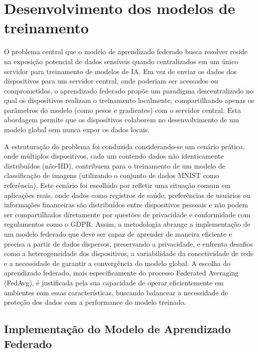 \chapter[Desenvolvimento dos modelos de treinamento]{Desenvolvimento dos modelos de treinamento}
\label{chap:desenvolvimento}

O problema central que o modelo de aprendizado federado busca resolver reside na exposição potencial de dados sensíveis quando centralizados em um único servidor para treinamento de modelos de IA. Em vez de enviar os dados dos dispositivos para um servidor central, onde poderiam ser acessados ou comprometidos, o aprendizado federado propõe um paradigma descentralizado no qual os dispositivos realizam o treinamento localmente, compartilhando apenas os parâmetros do modelo (como pesos e gradientes) com o servidor central. Esta abordagem permite que os dispositivos colaborem no desenvolvimento de um modelo global sem nunca expor os dados locais. 

A estruturação do problema foi conduzida considerando-se um cenário prático, onde múltiplos dispositivos, cada um contendo dados não identicamente distribuídos (não-IID), contribuem para o treinamento de um modelo de classificação de imagens (utilizando o conjunto de dados MNIST como referência). Este cenário foi escolhido por refletir uma situação comum em aplicações reais, onde dados como registros de saúde, preferências de usuários ou informações financeiras são distribuídos entre dispositivos pessoais e não podem ser compartilhados diretamente por questões de privacidade e conformidade com regulamentos como o GDPR. Assim, a metodologia abrange a implementação de um modelo federado que deve ser capaz de aprender de maneira eficiente e precisa a partir de dados dispersos, preservando a privacidade, e enfrenta desafios como a heterogeneidade dos dispositivos, a variabilidade da conectividade de rede e a necessidade de garantir a convergência do modelo global. A escolha do aprendizado federado, mais especificamente do processo Federated Averaging (FedAvg), é justificada pela sua capacidade de operar eficientemente em ambientes com essas características, buscando balancear a necessidade de proteção dos dados com a performance do modelo treinado.

\section{Implementação do Modelo de Aprendizado Federado}


